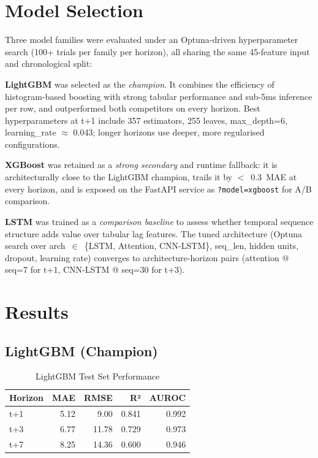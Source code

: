 \section{Model Selection}

Three model families were evaluated under an Optuna-driven hyperparameter search
(100+ trials per family per horizon), all sharing the same 45-feature input and
chronological split:

\textbf{LightGBM} was selected as the \emph{champion}. It combines the
efficiency of histogram-based boosting with strong tabular performance and sub-5ms
inference per row, and outperformed both competitors on every horizon. Best
hyperparameters at t+1 include 357 estimators, 255 leaves, max\_depth=6,
learning\_rate $\approx$ 0.043; longer horizons use deeper, more regularised
configurations.

\textbf{XGBoost} was retained as a \emph{strong secondary} and runtime fallback:
it is architecturally close to the LightGBM champion, trails it by $<$~0.3~MAE
at every horizon, and is exposed on the FastAPI service as
\texttt{?model=xgboost} for A/B comparison.

\textbf{LSTM} was trained as a \emph{comparison baseline} to assess whether
temporal sequence structure adds value over tabular lag features. The tuned
architecture (Optuna search over arch~$\in$~\{LSTM, Attention, CNN-LSTM\},
seq\_len, hidden units, dropout, learning rate) converges to architecture-horizon
pairs (attention @ seq=7 for t+1, CNN-LSTM @ seq=30 for t+3).

\section{Results}

\subsection{LightGBM (Champion)}

\begin{table}[H]
\centering
\caption{LightGBM Test Set Performance}
\label{tab:lgbm_results}
\begin{tabular}{lrrrr}
\toprule
\textbf{Horizon} & \textbf{MAE} & \textbf{RMSE} & \textbf{R²} & \textbf{AUROC} \\
\midrule
t+1 & 5.12 & 9.00  & 0.841 & 0.992 \\
t+3 & 6.77 & 11.78 & 0.729 & 0.973 \\
t+7 & 8.25 & 14.36 & 0.600 & 0.946 \\
\bottomrule
\end{tabular}
\end{table}


